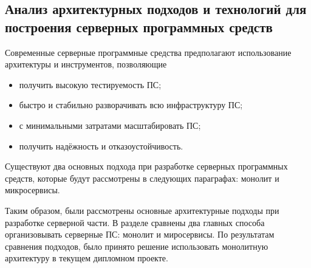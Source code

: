 \subsection{Анализ архитектурных подходов и технологий для построения серверных программных средств}
\label{sec:analysis:research:backArch}

Современные серверные программные средства предполагают использование архитектуры и инструментов, позволяющие

\begin{itemize}
\item получить высокую тестируемость ПС;
\item быстро и стабильно разворачивать всю инфраструктуру ПС;
\item с минимальными затратами масштабировать ПС;
\item получить надёжность и отказоустойчивость.
\end{itemize}

Существуют два основных подхода при разработке серверных программных средств, которые будут рассмотрены в следующих параграфах: монолит и микросервисы.




Таким образом, были рассмотрены основные архитектурные подходы при разработке серверной части. В разделе сравнены два главных способа организовывать серверные ПС: монолит и миросервисы. По результатам сравнения подходов, было принято решение использовать монолитную архитектуру в текущем дипломном проекте.
